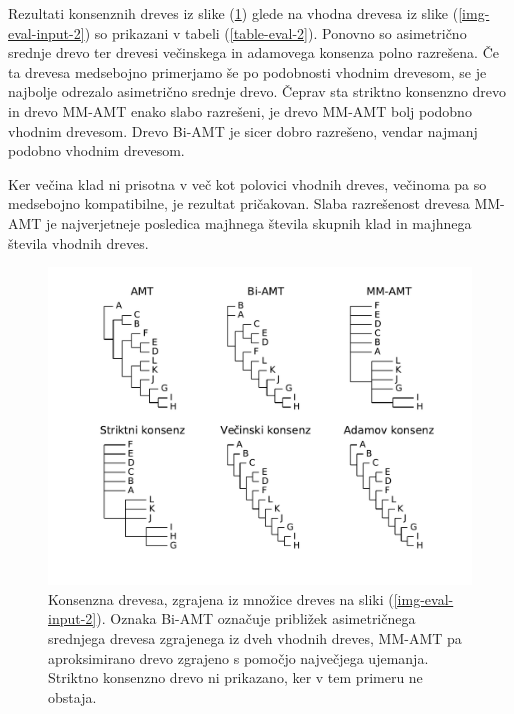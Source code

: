 \documentclass[a4paper, 12pt]{book}
\begin{document}
Rezultati konsenznih dreves iz slike (\ref{img-eval-result-2}) glede na vhodna drevesa iz slike (\ref{img-eval-input-2}) so prikazani v tabeli (\ref{table-eval-2}). Ponovno so asimetrično srednje drevo ter drevesi večinskega in adamovega konsenza polno razrešena. Če ta drevesa medsebojno primerjamo še po podobnosti vhodnim drevesom, se je najbolje odrezalo asimetrično srednje drevo. Čeprav sta striktno konsenzno drevo in drevo MM-AMT enako slabo razrešeni, je drevo MM-AMT bolj podobno vhodnim drevesom. Drevo Bi-AMT je sicer dobro razrešeno, vendar najmanj podobno vhodnim drevesom. 

Ker večina klad ni prisotna v več kot polovici vhodnih dreves, večinoma pa so medsebojno kompatibilne, je rezultat pričakovan. Slaba razrešenost drevesa MM-AMT je najverjetneje posledica majhnega števila skupnih klad in majhnega števila vhodnih dreves.   

\begin{figure}
	\begin{center}
		\includegraphics[scale=0.6, clip=true, trim=1.5cm 1.5cm 1cm 0.8cm]{gfx/eval_gfx_2.pdf}
	\end{center}
	\caption{Konsenzna drevesa, zgrajena iz množice dreves na sliki (\ref{img-eval-input-2}). Oznaka Bi-AMT označuje približek asimetričnega srednjega drevesa zgrajenega iz dveh vhodnih dreves, MM-AMT pa aproksimirano drevo zgrajeno s pomočjo največjega ujemanja. Striktno konsenzno drevo ni prikazano, ker v tem primeru ne obstaja.}
	\label{img-eval-result-2}
\end{figure}
\end{document}
